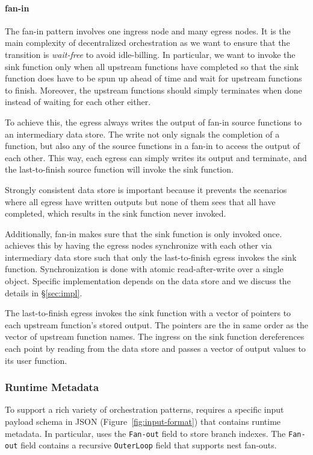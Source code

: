\paragraph{fan-in}

The fan-in pattern involves one ingress node and many egress nodes.
It is the main complexity of decentralized orchestration as we want to ensure
that the transition is \emph{wait-free} to avoid idle-billing. In particular,
we want to invoke the sink function only when all upstream functions have
completed so that the sink function does have to be spun up ahead of time and
wait for upstream functions to finish. Moreover, the upstream functions should
simply terminates when done instead of waiting for each other either.

To achieve this, the \name{} egress always writes the output of fan-in source
functions to an intermediary data store. The write not only signals the
completion of a function, but also any of the source functions in a fan-in to
access the output of each other. This way, each egress can simply writes its
output and terminate, and the last-to-finish source function will invoke the
sink function.

Strongly consistent data store is important because it prevents the
scenarios where all egress have written outputs but none of them sees that all
have completed, which results in the sink function never invoked.

Additionally, fan-in makes sure that the sink function is only invoked once.
\name{} achieves this by having the egress nodes synchronize with each other
via intermediary data store such that only the last-to-finish egress invokes
the sink function. Synchronization is done with atomic read-after-write over a
single object. Specific implementation depends on the data store and we
discuss the details in \S\ref{sec:impl}.

The last-to-finish egress invokes the sink function with a vector of pointers
to each upstream function's stored output. The pointers are the in same order
as the vector of upstream function names. The ingress on the sink function
dereferences each point by reading from the data store and passes a vector of
output values to its user function.


\subsubsection{Runtime Metadata}

To support a rich variety of orchestration patterns, \name{} requires a
specific input payload schema in JSON (Figure~\ref{fig:input-format}) that
contains \name{} runtime metadata. In particular, \name{} uses the
\texttt{Fan-out} field to store branch indexes. The \texttt{Fan-out} field
contains a recursive \texttt{OuterLoop} field that supports nest fan-outs.

